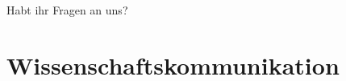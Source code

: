 \documentclass[compress, aspectratio=169]{beamer}
\begin{document}
\begin{frame}[plain]
  \begin{center}
    \Huge Habt ihr Fragen an uns?
    \end{center}
\end{frame}


\section{Wissenschaftskommunikation}
\end{document}
